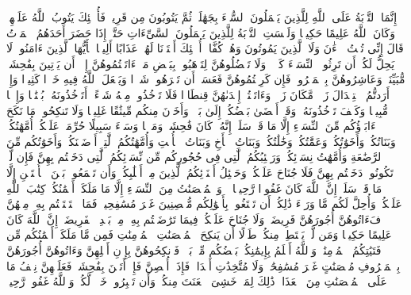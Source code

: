 \stopbuffer
\startbuffer[\q:4:17]
إِنَّمَا ٱلتَّوۡبَةُ عَلَى ٱللَّهِ لِلَّذِینَ یَعۡمَلُونَ ٱلسُّوۤءَ بِجَهَٰلَةࣲ ثُمَّ یَتُوبُونَ مِن قَرِیبࣲ فَأُو۟لَٰۤئِكَ یَتُوبُ ٱللَّهُ عَلَیۡهِمۡۗ وَكَانَ ٱللَّهُ عَلِیمًا حَكِیمࣰا%
\stopbuffer
\startbuffer[\q:4:18]
وَلَیۡسَتِ ٱلتَّوۡبَةُ لِلَّذِینَ یَعۡمَلُونَ ٱلسَّیِّءَاتِ حَتَّىٰۤ إِذَا حَضَرَ أَحَدَهُمُ ٱلۡمَوۡتُ قَالَ إِنِّی تُبۡتُ ٱلۡءَٰنَ وَلَا ٱلَّذِینَ یَمُوتُونَ وَهُمۡ كُفَّارٌۚ أُو۟لَٰۤئِكَ أَعۡتَدۡنَا لَهُمۡ عَذَابًا أَلِیمࣰا%
\stopbuffer
\startbuffer[\q:4:19]
یَٰۤأَیُّهَا ٱلَّذِینَ ءَامَنُوا۟ لَا یَحِلُّ لَكُمۡ أَن تَرِثُوا۟ ٱلنِّسَاۤءَ كَرۡهࣰاۖ وَلَا تَعۡضُلُوهُنَّ لِتَذۡهَبُوا۟ بِبَعۡضِ مَاۤ ءَاتَیۡتُمُوهُنَّ إِلَّاۤ أَن یَأۡتِینَ بِفَٰحِشَةࣲ مُّبَیِّنَةࣲۚ وَعَاشِرُوهُنَّ بِٱلۡمَعۡرُوفِۚ فَإِن كَرِهۡتُمُوهُنَّ فَعَسَىٰۤ أَن تَكۡرَهُوا۟ شَیۡءࣰا وَیَجۡعَلَ ٱللَّهُ فِیهِ خَیۡرࣰا كَثِیرࣰا%
\stopbuffer
\startbuffer[\q:4:20]
وَإِنۡ أَرَدتُّمُ ٱسۡتِبۡدَالَ زَوۡجࣲ مَّكَانَ زَوۡجࣲ وَءَاتَیۡتُمۡ إِحۡدَىٰهُنَّ قِنطَارࣰا فَلَا تَأۡخُذُوا۟ مِنۡهُ شَیۡءًاۚ أَتَأۡخُذُونَهُۥ بُهۡتَٰنࣰا وَإِثۡمࣰا مُّبِینࣰا%
\stopbuffer
\startbuffer[\q:4:21]
وَكَیۡفَ تَأۡخُذُونَهُۥ وَقَدۡ أَفۡضَىٰ بَعۡضُكُمۡ إِلَىٰ بَعۡضࣲ وَأَخَذۡنَ مِنكُم مِّیثَٰقًا غَلِیظࣰا%
\stopbuffer
\startbuffer[\q:4:22]
وَلَا تَنكِحُوا۟ مَا نَكَحَ ءَابَاۤؤُكُم مِّنَ ٱلنِّسَاۤءِ إِلَّا مَا قَدۡ سَلَفَۚ إِنَّهُۥ كَانَ فَٰحِشَةࣰ وَمَقۡتࣰا وَسَاۤءَ سَبِیلًا%
\stopbuffer
\startbuffer[\q:4:23]
حُرِّمَتۡ عَلَیۡكُمۡ أُمَّهَٰتُكُمۡ وَبَنَاتُكُمۡ وَأَخَوَٰتُكُمۡ وَعَمَّٰتُكُمۡ وَخَٰلَٰتُكُمۡ وَبَنَاتُ ٱلۡأَخِ وَبَنَاتُ ٱلۡأُخۡتِ وَأُمَّهَٰتُكُمُ ٱلَّٰتِیۤ أَرۡضَعۡنَكُمۡ وَأَخَوَٰتُكُم مِّنَ ٱلرَّضَٰعَةِ وَأُمَّهَٰتُ نِسَاۤئِكُمۡ وَرَبَٰۤئِبُكُمُ ٱلَّٰتِی فِی حُجُورِكُم مِّن نِّسَاۤئِكُمُ ٱلَّٰتِی دَخَلۡتُم بِهِنَّ فَإِن لَّمۡ تَكُونُوا۟ دَخَلۡتُم بِهِنَّ فَلَا جُنَاحَ عَلَیۡكُمۡ وَحَلَٰۤئِلُ أَبۡنَاۤئِكُمُ ٱلَّذِینَ مِنۡ أَصۡلَٰبِكُمۡ وَأَن تَجۡمَعُوا۟ بَیۡنَ ٱلۡأُخۡتَیۡنِ إِلَّا مَا قَدۡ سَلَفَۗ إِنَّ ٱللَّهَ كَانَ غَفُورࣰا رَّحِیمࣰا%
\stopbuffer
\startbuffer[\q:4:24]
۞ وَٱلۡمُحۡصَنَٰتُ مِنَ ٱلنِّسَاۤءِ إِلَّا مَا مَلَكَتۡ أَیۡمَٰنُكُمۡۖ كِتَٰبَ ٱللَّهِ عَلَیۡكُمۡۚ وَأُحِلَّ لَكُم مَّا وَرَاۤءَ ذَٰلِكُمۡ أَن تَبۡتَغُوا۟ بِأَمۡوَٰلِكُم مُّحۡصِنِینَ غَیۡرَ مُسَٰفِحِینَۚ فَمَا ٱسۡتَمۡتَعۡتُم بِهِۦ مِنۡهُنَّ فَءَاتُوهُنَّ أُجُورَهُنَّ فَرِیضَةࣰۚ وَلَا جُنَاحَ عَلَیۡكُمۡ فِیمَا تَرَٰضَیۡتُم بِهِۦ مِنۢ بَعۡدِ ٱلۡفَرِیضَةِۚ إِنَّ ٱللَّهَ كَانَ عَلِیمًا حَكِیمࣰا%
\stopbuffer
\startbuffer[\q:4:25]
وَمَن لَّمۡ یَسۡتَطِعۡ مِنكُمۡ طَوۡلًا أَن یَنكِحَ ٱلۡمُحۡصَنَٰتِ ٱلۡمُؤۡمِنَٰتِ فَمِن مَّا مَلَكَتۡ أَیۡمَٰنُكُم مِّن فَتَیَٰتِكُمُ ٱلۡمُؤۡمِنَٰتِۚ وَٱللَّهُ أَعۡلَمُ بِإِیمَٰنِكُمۚ بَعۡضُكُم مِّنۢ بَعۡضࣲۚ فَٱنكِحُوهُنَّ بِإِذۡنِ أَهۡلِهِنَّ وَءَاتُوهُنَّ أُجُورَهُنَّ بِٱلۡمَعۡرُوفِ مُحۡصَنَٰتٍ غَیۡرَ مُسَٰفِحَٰتࣲ وَلَا مُتَّخِذَٰتِ أَخۡدَانࣲۚ فَإِذَاۤ أُحۡصِنَّ فَإِنۡ أَتَیۡنَ بِفَٰحِشَةࣲ فَعَلَیۡهِنَّ نِصۡفُ مَا عَلَى ٱلۡمُحۡصَنَٰتِ مِنَ ٱلۡعَذَابِۚ ذَٰلِكَ لِمَنۡ خَشِیَ ٱلۡعَنَتَ مِنكُمۡۚ وَأَن تَصۡبِرُوا۟ خَیۡرࣱ لَّكُمۡۗ وَٱللَّهُ غَفُورࣱ رَّحِیمࣱ%

